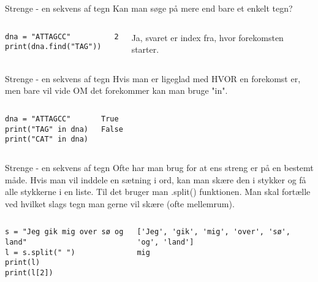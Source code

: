 \documentclass[main.tex]{subfiles}
\begin{document}
\begin{frame}[fragile]{Strenge - en sekvens af tegn}
	Kan man søge på mere end bare et enkelt tegn?
	\begin{columns}
	\begin{lstlisting}[style=python]
dna = "ATTAGCC"
print(dna.find("TAG"))
	\end{lstlisting}
		
	\pause
	\begin{lstlisting}[style=python]
2
	\end{lstlisting}
	Ja, svaret er index fra, hvor forekomsten starter.
	\end{columns}	
\end{frame}

\begin{frame}[fragile]{Strenge - en sekvens af tegn}
	Hvis man er ligeglad med HVOR en forekomst er, men bare vil vide OM det forekommer kan man bruge "in".
	\begin{columns}
		\column{0.4\textwidth}
		\begin{lstlisting}[style=python]
dna = "ATTAGCC"
print("TAG" in dna)
print("CAT" in dna)
		\end{lstlisting}
		
		\pause
		\column{0.4\textwidth}
		\begin{lstlisting}[style=python]
True
False
		\end{lstlisting}
	\end{columns}
\end{frame}

\begin{frame}[fragile]{Strenge - en sekvens af tegn}
	Ofte har man brug for at ens streng er på en bestemt måde. Hvis man vil inddele en sætning i ord, kan man skære den i stykker og få alle stykkerne i en liste. Til det bruger man .split() funktionen. Man skal fortælle ved hvilket slags tegn man gerne vil skære (ofte mellemrum).
	\begin{columns}
		\begin{lstlisting}[style=python]
s = "Jeg gik mig over sø og land"
l = s.split(" ")
print(l)
print(l[2])
		\end{lstlisting}
		
		\pause
		\begin{lstlisting}[style=python]
['Jeg', 'gik', 'mig', 'over', 'sø', 'og', 'land']
mig
		\end{lstlisting}
	\end{columns}
\end{frame}
\end{document}
